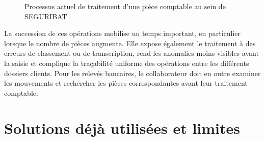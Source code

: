 \documentclass[12pt,a4paper,oneside]{report}
\begin{document}
\begin{figure}[H]
{%
}
\caption{Processus actuel de traitement d'une pièce comptable au sein de SEGURIBAT}
\label{fig:processus-actuel-seguribat}
\end{figure}

La succession de ces opérations mobilise un temps important, en particulier lorsque le nombre de pièces augmente. Elle expose également le traitement à des erreurs de classement ou de transcription, rend les anomalies moins visibles avant la saisie et complique la traçabilité uniforme des opérations entre les différents dossiers clients. Pour les relevés bancaires, le collaborateur doit en outre examiner les mouvements et rechercher les pièces correspondantes avant leur traitement comptable.

\section{Solutions déjà utilisées et limites}
\end{document}
